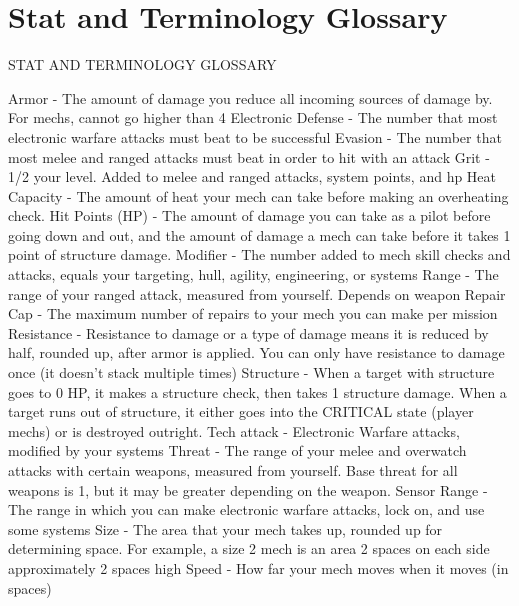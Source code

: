 \chapter{Stat and Terminology Glossary}
                          STAT AND TERMINOLOGY GLOSSARY

Armor - The amount of damage you reduce all incoming sources of damage by. For mechs,
cannot go higher than 4
Electronic Defense - The number that most electronic warfare attacks must beat to be
successful
Evasion - The number that most melee and ranged attacks must beat in order to hit with an
attack
Grit - 1/2 your level. Added to melee and ranged attacks, system points, and hp
Heat Capacity - The amount of heat your mech can take before making an overheating check.
Hit Points (HP) - The amount of damage you can take as a pilot before going down and out, and
the amount of damage a mech can take before it takes 1 point of structure damage.
Modifier - The number added to mech skill checks and attacks, equals your targeting, hull, agility,
engineering, or systems
Range - The range of your ranged attack, measured from yourself. Depends on weapon
Repair Cap - The maximum number of repairs to your mech you can make per mission
Resistance - Resistance to damage or a type of damage means it is reduced by half, rounded up,
after armor is applied. You can only have resistance to damage once (it doesn’t stack multiple
times)
Structure - When a target with structure goes to 0 HP, it makes a structure check, then takes 1
structure damage. When a target runs out of structure, it either goes into the CRITICAL state
(player mechs) or is destroyed outright.
Tech attack - Electronic Warfare attacks, modified by your systems
Threat - The range of your melee and overwatch attacks with certain weapons, measured from
yourself. Base threat for all weapons is 1, but it may be greater depending on the weapon.
Sensor Range - The range in which you can make electronic warfare attacks, lock on, and use
some systems
Size - The area that your mech takes up, rounded up for determining space. For example, a size
2 mech is an area 2 spaces on each side approximately 2 spaces high
Speed - How far your mech moves when it moves (in spaces)


